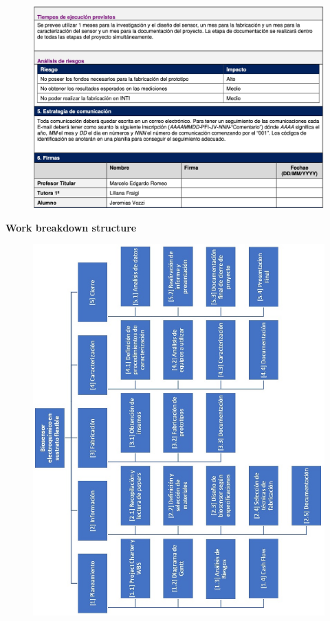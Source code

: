 \begin{figure}[H]
  \centering
    \includegraphics[width=1\textwidth]{Figuras/ProjChart3}
  \label{fig:ProjChart3}
\end{figure}
\newpage 
\begin{flushleft}
{\Large \textbf{Work breakdown structure}}
\end{flushleft}
\begin{figure}[H]
  \centering
    \includegraphics[width=1\textwidth]{Figuras/WBS}
  \label{fig:WBS}
\end{figure}
